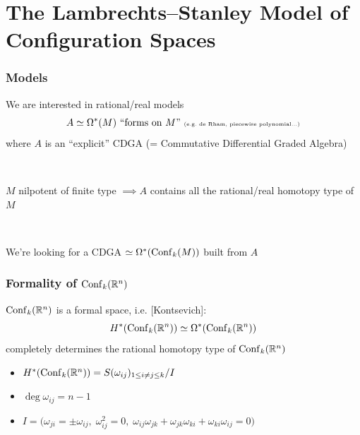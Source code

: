 \documentclass{beamer}
\begin{document}
\section{The Lambrechts--Stanley Model of Configuration Spaces}

\begin{frame}
  \frametitle{Models}
  We are interested in rational/real models
  \[ A \simeq \Omega^{*}(M) \text{ ``forms on } M \text{'' \tiny (e.g.\ de Rham, piecewise polynomial...)} \]
  where $A$ is an ``explicit'' CDGA {\tiny (= Commutative Differential Graded Algebra)}

  ~

  \pause $M$ nilpotent of finite type $\implies A$ contains all the rational/real homotopy type of $M$

  ~

  \pause We're looking for a CDGA $\simeq \Omega^{*}(\operatorname{Conf}_{k}(M))$ built from $A$
\end{frame}

\begin{frame}
  \frametitle{Formality of $\operatorname{Conf}_{k}(\mathbb{R}^n)$}
  $\operatorname{Conf}_{k}(\mathbb{R}^{n})$ is a formal space, i.e. [Kontsevich]:
  \[H^{*}(\operatorname{Conf}_{k}(\mathbb{R}^{n})) \simeq \Omega^{*}(\operatorname{Conf}_{k}(\mathbb{R}^{n}))\]
  completely determines the rational homotopy type of $\operatorname{Conf}_{k}(\mathbb{R}^{n})$

  \pause
  \begin{theorem}
    \begin{itemize}
    \item $H^{*}(\operatorname{Conf}_{k}(\mathbb{R}^{n})) = S(\omega_{ij})_{1 \leq i \neq j \leq k} / I$
    \item $\deg \omega_{ij} = n-1$
    \item $I = \bigl( \omega_{ji} = \pm \omega_{ij},\; \omega_{ij}^{2} = 0,\; \omega_{ij} \omega_{jk} + \omega_{jk} \omega_{ki} + \omega_{ki} \omega_{ij} = 0 \bigr)$
    \end{itemize}
  \end{theorem}
\end{frame}
\end{document}
